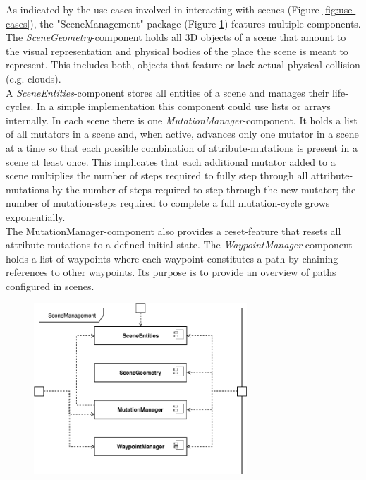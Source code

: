 As indicated by the use-cases involved in interacting with scenes (Figure \ref{fig:use-cases}), the "SceneManagement"-package (Figure \ref{fig:component-diagram-scenemanagement}) features multiple components.\\
The \emph{SceneGeometry}-component holds all 3D objects of a scene that amount to the visual representation and physical bodies of the place the scene is meant to represent. This includes both, objects that feature or lack actual physical collision (e.g. clouds).\\
A \emph{SceneEntities}-component stores all entities of a scene and manages their life-cycles. In a simple implementation this component could use lists or arrays internally.
In each scene there is one \emph{MutationManager}-component. It holds a list of all mutators in a scene and, when active, advances only one mutator in a scene at a time so that each possible combination of attribute-mutations is present in a scene at least once. This implicates that each additional mutator added to a scene multiplies the number of steps required to fully step through all attribute-mutations by the number of steps required to step through the new mutator; the number of mutation-steps required to complete a full mutation-cycle grows exponentially.\\
The MutationManager-component also provides a reset-feature that resets all attribute-mutations to a defined initial state.
The \emph{WaypointManager}-component holds a list of waypoints where each waypoint constitutes a path by chaining references to other waypoints. Its purpose is to provide an overview of paths configured in scenes.\\
\begin{figure}[b]
    \centering
    \includegraphics[width=8cm]{tex/img/ch04/ComponentDiagram_SceneManagement.pdf}
    \label{fig:component-diagram-scenemanagement}
\end{figure}
%

